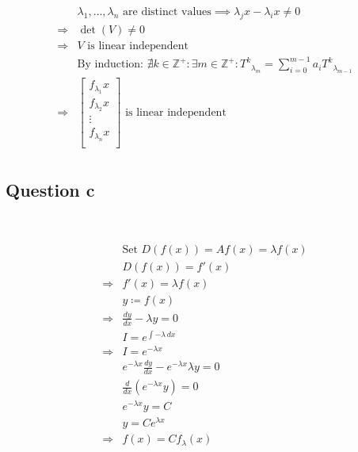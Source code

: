 \documentclass{article}
\begin{document}
\begin{equation*}
\begin{split}
        &\lambda_1,\ldots ,\lambda_n\text{ are distinct values}\implies \lambda_jx-\lambda_ix\ne0\\
        \Rightarrow&\det(V)\ne0\\
        \Rightarrow &V \text{ is linear independent}\\
        &\text{By induction: }\nexists k\in\mathbb{Z}^+ : \exists m\in\mathbb{Z}^+: {T^k}_{\lambda_m}=\sum_{i=0}^{m-1}a_i{T^k}  _{\lambda_{m-1}}\\
        \Rightarrow &\begin{bmatrix}
            f_{\lambda_{1}}x\\
            f_{\lambda_{2}}x\\
            \vdots\\
            f_{\lambda_{n}}x\\
        \end{bmatrix}\text{ is linear independent}\\
    \end{split}
\end{equation*}

\subsection{Question c}

~

\begin{equation*}
    \begin{split}
        &\text{Set }D(f(x))=Af(x)=\lambda f(x)\\
        &D(f(x))=f'(x)\\
        \Rightarrow&f'(x)=\lambda f(x)\\
        &y\coloneqq f(x)\\
        \Rightarrow&\frac{dy}{dx} -\lambda y=0\\
        &I=e^{\int -\lambda \,dx }\\
        \Rightarrow&I=e^{-\lambda x}\\
        &e^{-\lambda x}\frac{dy}{dx}-e^{-\lambda x}\lambda y=0\\
        &\frac{d}{dx}(e^{-\lambda x}y)=0\\
        &e^{-\lambda x}y=C\\
        &y=Ce^{\lambda x}\\
        \Rightarrow& f(x)=Cf_\lambda (x)\\
    \end{split}
\end{equation*}
\end{document}
